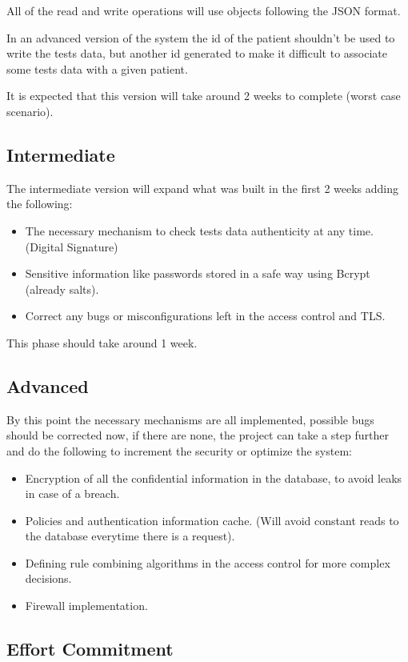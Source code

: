 All of the read and write operations will use objects following the JSON format.

In an advanced version of the system the id of the patient shouldn't be used to write the tests data, but another id generated to make it difficult to associate some tests data with a given patient.

It is expected that this version will take around 2 weeks to complete (worst case scenario). 


\subsection{Intermediate}
The intermediate version will expand what was built in the first 2 weeks adding the following:
\begin{itemize}
	\item The necessary mechanism to check tests data authenticity at any time. (Digital Signature)
	\item Sensitive information like passwords stored in a safe way using Bcrypt (already salts).
	\item Correct any bugs or misconfigurations left in the access control and TLS.
\end{itemize}

This phase should take around 1 week.


\subsection{Advanced}

By this point the necessary mechanisms are all implemented, possible bugs should be corrected now, if there are none, the project can take a step further and do the following to increment the security or optimize the system:

\begin{itemize}
	\item Encryption of all the confidential information in the database, to avoid leaks in case of a breach.
	\item Policies and authentication information cache. (Will avoid constant reads to the database everytime there is a request).
	\item Defining rule combining algorithms in the access control for  more complex decisions.
	\item Firewall implementation.
\end{itemize}


\subsection{Effort Commitment}

